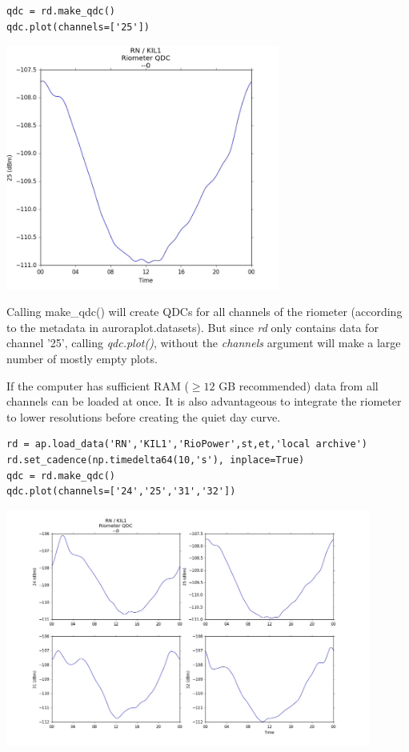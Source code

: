 \documentclass{article}
\begin{document}
\begin{lstlisting}[style=pythonstyle]
qdc = rd.make_qdc()
qdc.plot(channels=['25'])
\end{lstlisting}

\includegraphics[width=9cm]{images/figure_2.png}


Calling make\_qdc() will create QDCs for all channels of the riometer (according to the metadata in auroraplot.datasets). But since {\it rd} only contains data for channel '25', calling {\it qdc.plot()}, without the {\it channels} argument will make a large number of mostly empty plots.

If the computer has sufficient RAM ($\ge 12$ GB recommended) data from all channels can be loaded at once. It is also advantageous to integrate the riometer to lower resolutions before creating the quiet day curve.

\begin{lstlisting}[style=pythonstyle]
rd = ap.load_data('RN','KIL1','RioPower',st,et,'local archive')
rd.set_cadence(np.timedelta64(10,'s'), inplace=True)
qdc = rd.make_qdc()
qdc.plot(channels=['24','25','31','32'])
\end{lstlisting}

\includegraphics[width=12cm]{images/figure_3.png}
\end{document}
